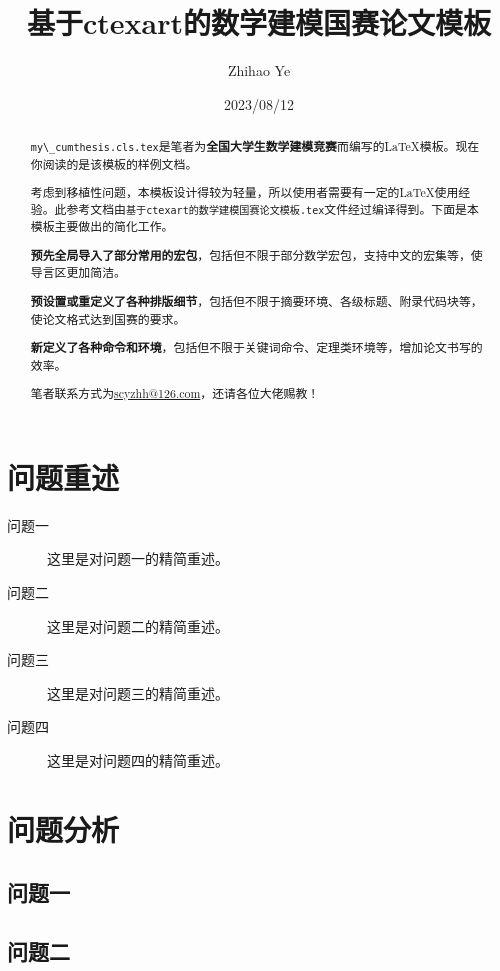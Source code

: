 \documentclass{my_cumcmthesis}
\title{基于ctexart的数学建模国赛论文模板} %
\author{Zhihao Ye} %
\date{2023/08/12} %
\begin{document}
\maketitle %
\begin{abstract}
    \colorbox{gray!15}{\lstinline!my\_cumthesis.cls.tex!}是笔者为\textbf{全国大学生数学建模竞赛}而编写的\LaTeX{}模板。现在你阅读的是该模板的样例文档。
    
    考虑到移植性问题，本模板设计得较为轻量，所以使用者需要有一定的\LaTeX{}使用经验。此参考文档由\colorbox{gray!15}{\lstinline!基于ctexart的数学建模国赛论文模板.tex!}文件经过\XeLaTeX{}编译得到。下面是本模板主要做出的简化工作。

    \textbf{预先全局导入了部分常用的宏包}，包括但不限于\AmS{}部分数学宏包，支持中文的\CTeX{}宏集等，使导言区更加简洁。

    \textbf{预设置或重定义了各种排版细节}，包括但不限于摘要环境、各级标题、附录代码块等，使论文格式达到国赛的要求。

    \textbf{新定义了各种命令和环境}，包括但不限于关键词命令、定理类环境等，增加论文书写的效率。

    笔者联系方式为\url{scyzhh@126.com}，还请各位大佬赐教！

\end{abstract}

\section{问题重述}

\begin{description}
    \item[问题一] 这里是对问题一的精简重述。
    \item[问题二] 这里是对问题二的精简重述。
    \item[问题三] 这里是对问题三的精简重述。
    \item[问题四] 这里是对问题四的精简重述。
\end{description}

\section{问题分析}
\subsection{问题一}
    \zhlipsum[1] %
\subsection{问题二}
    \zhlipsum[2] %
\end{document}
